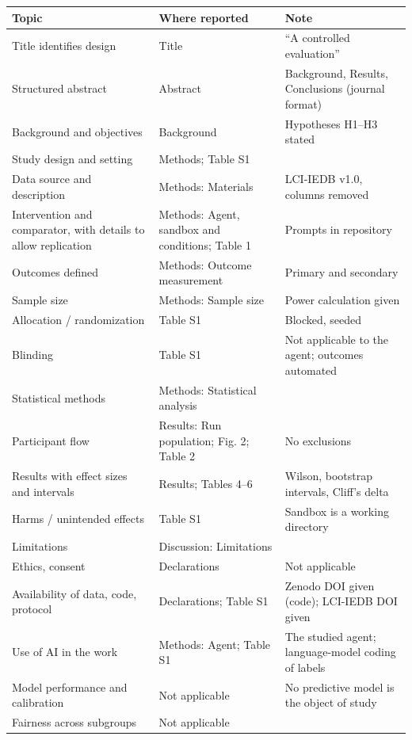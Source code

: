 \documentclass[11pt,a4paper]{article}
\begin{document}
\begin{small}
\begin{tabularx}{\textwidth}{@{}>{\raggedright\arraybackslash}p{4.2cm}>{\raggedright\arraybackslash}p{4.4cm}X@{}}
\toprule
Topic & Where reported & Note\\
\midrule
Title identifies design & Title & ``A controlled evaluation''\\
Structured abstract & Abstract & Background, Results, Conclusions (journal format)\\
Background and objectives & Background & Hypotheses H1--H3 stated\\
Study design and setting & Methods; Table S1 & \\
Data source and description & Methods: Materials & LCI-IEDB v1.0, columns removed\\
Intervention and comparator, with details to allow replication & Methods: Agent, sandbox and conditions; Table 1 & Prompts in repository\\
Outcomes defined & Methods: Outcome measurement & Primary and secondary\\
Sample size & Methods: Sample size & Power calculation given\\
Allocation / randomization & Table S1 & Blocked, seeded\\
Blinding & Table S1 & Not applicable to the agent; outcomes automated\\
Statistical methods & Methods: Statistical analysis & \\
Participant flow & Results: Run population; Fig. 2; Table 2 & No exclusions\\
Results with effect sizes and intervals & Results; Tables 4--6 & Wilson, bootstrap intervals, Cliff's delta\\
Harms / unintended effects & Table S1 & Sandbox is a working directory\\
Limitations & Discussion: Limitations & \\
Ethics, consent & Declarations & Not applicable\\
Availability of data, code, protocol & Declarations; Table S1 & Zenodo DOI given (code); LCI-IEDB DOI given\\
Use of AI in the work & Methods: Agent; Table S1 & The studied agent; language-model coding of labels\\
Model performance and calibration & Not applicable & No predictive model is the object of study\\
Fairness across subgroups & Not applicable & \\
\bottomrule
\end{tabularx}
\end{small}
\end{document}
